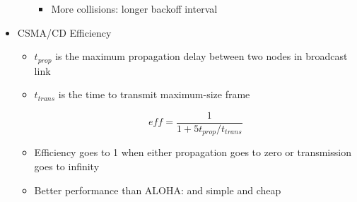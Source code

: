 \begin{itemize}
\begin{itemize}
\begin{itemize}
          \item More collisions: longer backoff interval

        \end{itemize}

    \end{itemize}

  \item CSMA/CD Efficiency

    \begin{itemize}

      \item $t_{prop}$ is the maximum propagation delay between two nodes in broadcast link

      \item $t_{trans}$ is the time to transmit maximum-size frame

        $$eff=\frac{1}{1+5t_{prop}/t_{trans}}$$

      \item Efficiency goes to 1 when either propagation goes to zero or transmission goes to infinity

      \item Better performance than ALOHA: and simple and cheap

    \end{itemize}

\end{itemize}



